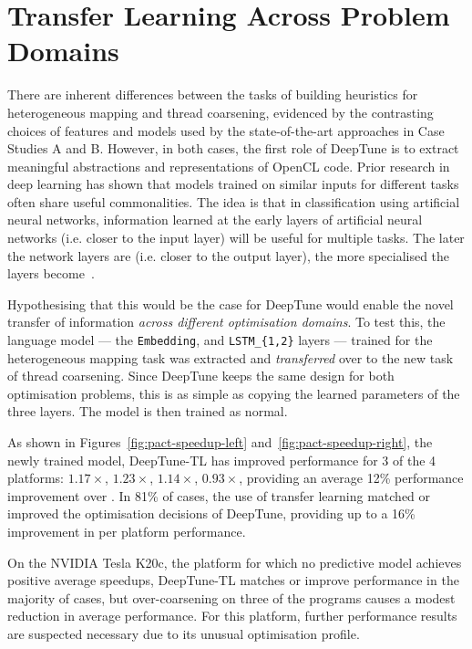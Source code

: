 \section{Transfer Learning Across Problem Domains}
\label{sec:deeptune-transfer-learning}

There are inherent differences between the tasks of building heuristics for heterogeneous mapping and thread coarsening, evidenced by the contrasting choices of features and models used by the state-of-the-art approaches in Case Studies A and B. However, in both cases, the first role of DeepTune is to extract meaningful abstractions and representations of OpenCL code. Prior research in deep learning has shown that models trained on similar inputs for different tasks often share useful commonalities. The idea is that in classification using artificial neural networks, information learned at the early layers of artificial neural networks (i.e. closer to the input layer) will be useful for multiple tasks. The later the network layers are (i.e. closer to the output layer), the more specialised the layers become~\cite{Zeiler2014}.

Hypothesising that this would be the case for DeepTune would enable the novel transfer of information \emph{across different optimisation domains}. To test this, the language model --- the \texttt{Embedding}, and \texttt{LSTM\_\{1,2\}} layers --- trained for the heterogeneous mapping task was extracted and \emph{transferred} over to the new task of thread coarsening. Since DeepTune keeps the same design for both optimisation problems, this is as simple as copying the learned parameters of the three layers. The model is then trained as normal.

As shown in Figures~\ref{fig:pact-speedup-left} and~\ref{fig:pact-speedup-right}, the newly trained model, DeepTune-TL has improved performance for 3 of the 4 platforms: $1.17\times$, $1.23\times$, $1.14\times$, $0.93\times$, providing an average 12\% performance improvement over \citeauthor{Magni2014}. In 81\% of cases, the use of transfer learning matched or improved the optimisation decisions of DeepTune, providing up to a 16\% improvement in per platform performance.

On the NVIDIA Tesla K20c, the platform for which no predictive model achieves positive average speedups, DeepTune-TL matches or improve performance in the majority of cases, but over-coarsening on three of the programs causes a modest reduction in average performance. For this platform, further performance results are suspected necessary due to its unusual optimisation profile.
